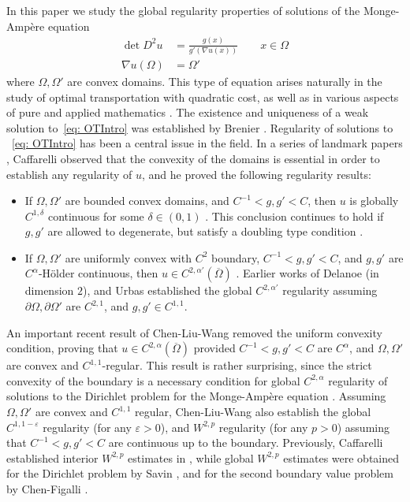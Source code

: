 \documentclass[12pt,reqno]{amsart}
\newcommand{\del}{\partial}
\newcommand{\eps}{\varepsilon}
\numberwithin{equation}{section}
\begin{document}
In this paper we study the global regularity properties of solutions of the Monge-Amp\`ere equation
\begin{equation}\label{eq: OTIntro}
\begin{aligned}
\det D^2u &= \frac{g(x)}{g'(\nabla u(x))} \qquad x \in \Omega\\
\nabla u(\Omega) &= \Omega'
\end{aligned}
\end{equation}
where $\Omega, \Omega'$ are convex domains.  This type of equation arises naturally in the study of optimal transportation with quadratic cost, as well as in various aspects of pure and applied mathematics \cite{DPF, Evans, RR, Villani, Villani2}. The existence and uniqueness of a weak solution to~\eqref{eq: OTIntro} was established by Brenier \cite{Brenier}.  Regularity of solutions to ~\eqref{eq: OTIntro} has been a central issue in the field.  In a series of landmark papers \cite{Caffarelli, Caffarelli2, Caffarelli3}, Caffarelli observed that the convexity of the domains is essential in order to establish any regularity of $u$, and he proved the following regularity results:
\begin{itemize}
\item If $\Omega, \Omega'$ are bounded convex domains, and $C^{-1} < g,g'< C$, then $u$ is globally $C^{1,\delta}$ continuous for some $\delta\in (0, 1)$ \cite{Caffarelli2}.  This conclusion continues to hold if $g, g'$ are allowed to degenerate, but satisfy a doubling type condition \cite{Jhaveri-Savin}.
\item If $\Omega, \Omega'$ are uniformly convex with $C^2$ boundary, $C^{-1}<g,g'<C$, and $g,g'$ are $C^{\alpha}$-H\"older continuous, then $u\in C^{2,\alpha'}(\overline{\Omega})$ \cite{Caffarelli3}. Earlier works of Delanoe \cite{Delanoe} (in dimension $2$), and Urbas \cite{Urbas} established the global $C^{2,\alpha'}$ regularity assuming $\del\Omega, \del\Omega'$ are $C^{2,1}$, and $g,g' \in C^{1,1}$.
\end{itemize}
An important recent result of Chen-Liu-Wang \cite{Chen-Liu-Wang} removed the uniform convexity condition, proving that $u \in C^{2,\alpha}(\overline{\Omega})$ provided $C^{-1}<g,g'<C$ are $C^{\alpha}$, and $\Omega, \Omega'$ are convex and $C^{1,1}$-regular. This result is rather surprising, since the strict convexity of the boundary is a necessary condition for global $C^{2,\alpha}$ regularity of solutions to the Dirichlet problem for the Monge-Amp\`ere equation \cite{CNS, Cheng-Yau, Savin2, Trudinger-Wang}. Assuming $\Omega, \Omega'$ are convex and $C^{1,1}$ regular,  Chen-Liu-Wang also establish the global $C^{1,1-\eps}$ regularity (for any $\eps>0$), and $W^{2,p}$ regularity (for any $p>0$) assuming that $C^{-1}<g,g'<C$ are continuous up to the boundary.  Previously,  Caffarelli established interior $W^{2,p}$ estimates in \cite{Caffarelli4}, while global $W^{2,p}$ estimates were obtained for the Dirichlet problem by Savin \cite{Savin}, and for the second boundary value problem by Chen-Figalli \cite{Chen-Figalli}.  
\end{document}
